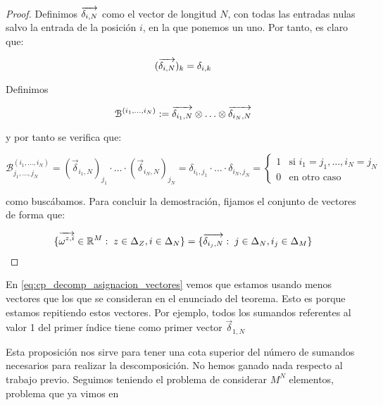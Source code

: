 \begin{proof}
    Definimos $\overrightarrow{\delta_{i, N}}$ como el vector de longitud $N$, con todas las entradas nulas salvo la entrada de la posición $i$, en la que ponemos un uno. Por tanto, es claro que:

    \begin{equation}
        (\overrightarrow{\delta_{i, N}})_k =  \delta_{i, k}
    \end{equation}

    Definimos

    \begin{equation}
        \mathcal{B}^{(i_1, \ldots, i_N)} := \overrightarrow{\delta_{i_1, N}} \otimes \ldots \otimes \overrightarrow{\delta_{i_N, N}}
    \end{equation}

    y por tanto se verifica que:

    \begin{equation}
        \mathcal{B}^{(i_1, \ldots, i_N)}_{j_1, \ldots, j_N} = (\vec{\delta}_{i_1, N})_{j_1} \cdot \ldots \cdot (\vec{\delta}_{i_N, N})_{j_N} = \delta_{i_1, j_1} \cdot \ldots \cdot \delta_{i_N, j_N} =
        \begin{cases}
            1 & \text{si } i_1 = j_1, \ldots, i_N = j_N \\
            0 & \text{en otro caso}
        \end{cases}
    \end{equation}

    como buscábamos. Para concluir la demostración, fijamos el conjunto de vectores de forma que:

    \begin{equation} \label{eq:cp_decomp_asignacion_vectores}
        \{\overrightarrow{\omega^{z, i}} \in \mathbb{R}^M : \; z \in \Delta_{Z}, i \in \Delta_{N} \} =
        \{ \overrightarrow{\delta_{i_j, N}} : \; j \in \Delta_{N}, i_j \in \Delta_{M} \}
    \end{equation}

\end{proof}

\begin{observacion}
    En \eqref{eq:cp_decomp_asignacion_vectores} vemos que estamos usando menos vectores que los que se consideran en el enunciado del teorema. Esto es porque estamos repitiendo estos vectores. Por ejemplo, todos los sumandos referentes al valor 1 del primer índice tiene como primer vector $\vec{\delta}_{1, N}$
\end{observacion}

\begin{observacion}
    Esta proposición nos sirve para tener una cota superior del número de sumandos necesarios para realizar la descomposición. No hemos ganado nada respecto al trabajo previo. Seguimos teniendo el problema de considerar $M^N$ elementos, problema que ya vimos en 
\end{observacion}

